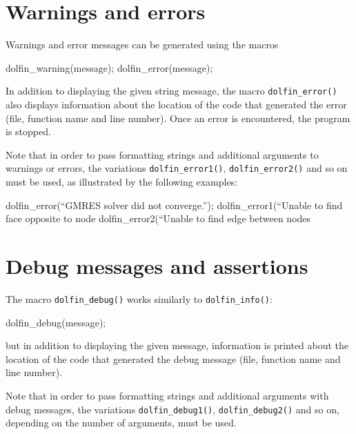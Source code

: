 \section{Warnings and errors}

Warnings and error messages can be generated using the macros
\begin{code}
dolfin_warning(message);
dolfin_error(message);
\end{code}

In addition to displaying the given string message, the macro
\texttt{dolfin\_error()} also displays information about the location
of the code that generated the error (file, function name and line
number). Once an error is encountered, the program is stopped.

Note that in order to pass formatting strings and additional arguments
to warnings or errors, the variations \texttt{dolfin\_error1()},
\texttt{dolfin\_error2()} and so on must be used, as illustrated by
the following examples:
\footnotesize
\begin{code}
dolfin_error(``GMRES solver did not converge.'');
dolfin_error1(``Unable to find face opposite to node %
dolfin_error2(``Unable to find edge between nodes %
\end{code}
\normalsize

\section{Debug messages and assertions}

The macro \texttt{dolfin\_debug()} works similarly to
\texttt{dolfin\_info()}:
\begin{code}
dolfin_debug(message);
\end{code}
but in addition to displaying the given message, information is printed about
the location of the code that generated the debug message (file,
function name and line number).

Note that in order to pass formatting strings and additional arguments
with debug messages, the variations \texttt{dolfin\_debug1()},
\texttt{dolfin\_debug2()} and so on, depending on the number of
arguments, must be used.

